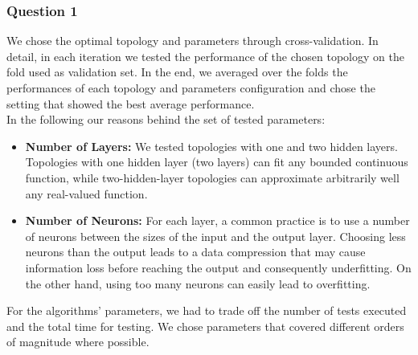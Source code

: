\documentclass{article}
\begin{document}
\subsubsection*{Question 1}
We chose the optimal topology and parameters through cross-validation. In detail, in each iteration we tested the performance of the chosen topology on the fold used as validation set. In the end, we averaged over the folds the performances of each topology and parameters configuration and chose the setting that showed the best average performance.\\
In the following our reasons behind the set of tested parameters:
\begin{itemize}
\item \textbf{Number of Layers:} We tested topologies with one and two hidden layers. Topologies with one hidden layer (two layers) can fit any bounded continuous function, while two-hidden-layer topologies can approximate arbitrarily well any real-valued function.
\item \textbf{Number of Neurons:} For each layer, a common practice is to use a number of neurons between the sizes of the input and the output layer. Choosing less neurons than the output leads to a data compression that may cause information loss before reaching the output and consequently underfitting. On the other hand, using too many neurons can easily lead to overfitting.
\end{itemize}
For the algorithms' parameters, we had to trade off the number of tests executed and the total time for testing. We chose parameters that covered different orders of magnitude where possible.
\end{document}
